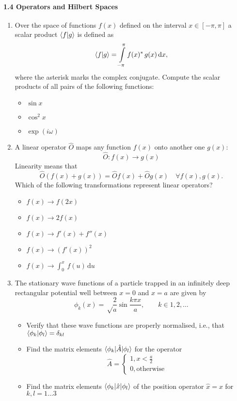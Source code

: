 \documentclass{chem6155problemset}
\begin{document}
\paragraph{1.4 Operators and Hilbert Spaces}
\begin{enumerate}[resume]
	\item Over the space of functions $f(x)$ defined on the interval $x\in [-\pi,\pi]$ a scalar
	product $\langle {f} | {g}\rangle$ is defined as
	\[ \langle {f} | {g}\rangle = \int\limits_{-\pi}^{\pi} f(x)^\ast \,g(x)\,\mathrm{d}x, \]
	where the asterisk marks the complex conjugate.
	Compute the scalar products of all pairs of the following functions:

	\begin{itemize}
		\item $\sin x$
		\item $\cos^2 x$
		\item $\exp(i \omega )$

	\end{itemize}

	\item A linear operator $\hat O$ maps any function $f(x)$ onto another one $g(x)$:
	\[ \hat O : f(x)\longrightarrow g(x) \]
	Linearity means that
	\[ \hat O (f(x)+g(x)) = \hat O f(x) + \hat O g(x) \quad \forall f(x),g(x). \]
	Which of the following transformations represent linear operators?
	\begin{itemize}
	  \item $f(x) \longrightarrow f(2x) $
	  \item $f(x) \longrightarrow 2f(x) $
	  \item $f(x) \longrightarrow f'(x) + f''(x)$
	  \item $f(x) \longrightarrow (f'(x))^2 $
	  \item $f(x) \longrightarrow \int_0^x\,f(u)\,\mathrm{d}u $
	\end{itemize}


	\item The stationary wave functions of a particle trapped in an infinitely deep rectangular potential
	well between $x=0$ and $x=a$ are given by
	\[ \phi_k(x) = \sqrt\frac{2}{a} \sin \frac{k \pi x}{a},\qquad k\in 1,2,\dots\]
	\begin{itemize}
		\item Verify that these wave functions are properly normalised, i.e., that $\langle {\phi_k} | {\phi_l}\rangle = \delta_{kl}$
    \item Find the matrix elements $\langle{\phi_k}|\hat A|{\phi_l}\rangle$ for the operator
    \[\hat A = \begin{cases}
         1, x<\frac{a}{2} \\
         0, \text{otherwise}
       \end{cases}
       \]

		\item Find the matrix  elements $\langle{\phi_k}|\hat x|{\phi_l}\rangle$ of the position operator $\hat{x} = x$
      for $k,l=1\dots3$

		\end{itemize}

\end{enumerate}
\end{document}
